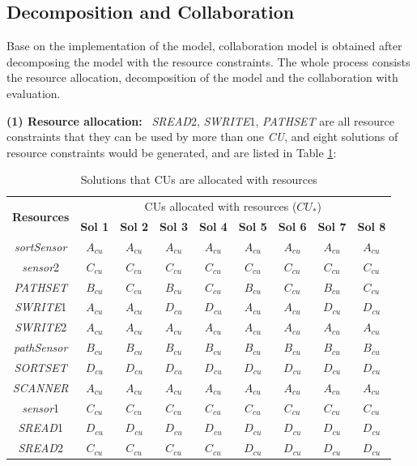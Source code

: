 \subsection{Decomposition and Collaboration}
Base on the implementation of the model, collaboration model is obtained after decomposing the model with the resource constraints. The whole process consists the resource allocation, decomposition of the model and the collaboration with evaluation.

\textbf{(1) Resource allocation:} \
 \emph{SREAD}2, \emph{SWRITE}1, \emph{PATHSET} are all resource constraints that they can be used by more than one \emph{CU}, and eight solutions of resource constraints would be generated, and are listed in Table \ref{ResourcesAllocation}:

\begin{table}[!htb]
 \centering
\small
\caption{\label{ResourcesAllocation}Solutions that CUs are allocated with resources}
\begin{tabular}{|c|c|c|c|c|c|c|c|c|}

\hline

\multirow{2}{*}{\textbf{Resources}} &
\multicolumn{8}{|c|}{CUs allocated with resources ($CU_{\ast}$)} \\
\cline{2-9}
   &\textbf{ Sol 1 } &\textbf{ Sol 2 } &\textbf{ Sol 3 } &\textbf{ Sol 4 } &\textbf{Sol 5 } &\textbf{ Sol 6 } &\textbf{ Sol 7 } &\textbf{ Sol 8 }\\
\hline
\emph{sortSensor}   &$A_{cu}$ &$A_{cu}$ &$A_{cu}$ &$A_{cu}$ &$A_{cu}$ &$A_{cu}$ &$A_{cu}$ &$A_{cu}$ \\
\emph{sensor}2      &$C_{cu}$ &$C_{cu}$ &$C_{cu}$ &$C_{cu}$ &$C_{cu}$ &$C_{cu}$ &$C_{cu}$ &$C_{cu}$ \\
\emph{PATHSET}      &$B_{cu}$ &$C_{cu}$ &$B_{cu}$ &$C_{cu}$ &$B_{cu}$ &$C_{cu}$ &$B_{cu}$ &$C_{cu}$ \\
\emph{SWRITE}1      &$A_{cu}$ &$A_{cu}$ &$D_{cu}$ &$D_{cu}$ &$A_{cu}$ &$A_{cu}$ &$D_{cu}$ &$D_{cu}$ \\
\emph{SWRITE}2      &$A_{cu}$ &$A_{cu}$ &$A_{cu}$ &$A_{cu}$ &$A_{cu}$ &$A_{cu}$ &$A_{cu}$ &$A_{cu}$ \\
\emph{pathSensor}   &$B_{cu}$ &$B_{cu}$ &$B_{cu}$ &$B_{cu}$ &$B_{cu}$ &$B_{cu}$ &$B_{cu}$ &$B_{cu}$ \\
\emph{SORTSET}      &$D_{cu}$ &$D_{cu}$ &$D_{cu}$ &$D_{cu}$ &$D_{cu}$ &$D_{cu}$ &$D_{cu}$ &$D_{cu}$ \\
\emph{SCANNER}      &$A_{cu}$ &$A_{cu}$ &$A_{cu}$ &$A_{cu}$ &$A_{cu}$ &$A_{cu}$ &$A_{cu}$ &$A_{cu}$ \\
\emph{sensor}1      &$C_{cu}$ &$C_{cu}$ &$C_{cu}$ &$C_{cu}$ &$C_{cu}$ &$C_{cu}$ &$C_{cu}$ &$C_{cu}$ \\
\emph{SREAD}1       &$D_{cu}$ &$D_{cu}$ &$D_{cu}$ &$D_{cu}$ &$D_{cu}$ &$D_{cu}$ &$D_{cu}$ &$D_{cu}$ \\
\emph{SREAD}2       &$C_{cu}$ &$C_{cu}$ &$C_{cu}$ &$C_{cu}$ &$D_{cu}$ &$D_{cu}$ &$D_{cu}$ &$D_{cu}$ \\


\end{tabular}
\end{table}
